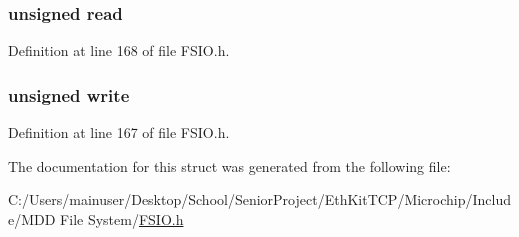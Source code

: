 \subsubsection[{read}]{\setlength{\rightskip}{0pt plus 5cm}unsigned read}\label{struct_f_i_l_e_f_l_a_g_s_aab11600d260ceda088519026bea9ae68}


Definition at line 168 of file F\+S\+I\+O.\+h.

\hypertarget{struct_f_i_l_e_f_l_a_g_s_a7f9bd405bd2f03dec58905c3ec5f2964}{}
\subsubsection[{write}]{\setlength{\rightskip}{0pt plus 5cm}unsigned write}\label{struct_f_i_l_e_f_l_a_g_s_a7f9bd405bd2f03dec58905c3ec5f2964}


Definition at line 167 of file F\+S\+I\+O.\+h.



The documentation for this struct was generated from the following file\+:\begin{DoxyCompactItemize}
\item 
C\+:/\+Users/mainuser/\+Desktop/\+School/\+Senior\+Project/\+Eth\+Kit\+T\+C\+P/\+Microchip/\+Include/\+M\+D\+D File System/\hyperlink{_f_s_i_o_8h}{F\+S\+I\+O.\+h}\end{DoxyCompactItemize}
